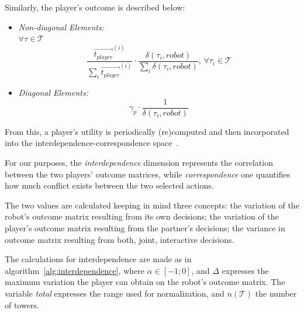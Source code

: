 \begin{itemize}
\end{itemize}

Similarly, the player's outcome is described below:
\begin{itemize}
\item \textit{Non-diagonal Elements:}\\
$\forall\tau \in \mathcal{T}$\\
\begin{equation}
 \frac{\overrightarrow{t_{player}}^{(i)}}{\sum_{i}{\overrightarrow{t_{player}}^{(i)}}} \cdot \frac{\delta(\tau_{i},robot)}{\sum_{i}{\delta(\tau_{i},robot)}}, \, \forall\tau_{i} \in \mathcal{T} 
\end{equation}
\item \textit{Diagonal Elements:}
\begin{equation}
\gamma_p \cdot \frac{1}{\delta(\tau_{i},robot)}
\end{equation}
\end{itemize}

From this, a player's utility is periodically (re)computed and then incorporated into the interdependence-correspondence space~\cite{wagner_acting_2011}.

For our purposes, the \textit{interdependence} dimension represents the correlation between the two players' outcome matrices, while \textit{correspondence} one quantifies how much conflict exists between the two selected actions.

The two values are calculated keeping in mind three concepts: the variation of the robot's outcome matrix resulting from its own decisions; the variation of the player's outcome matrix resulting from the partner's decisions; the variance in outcome matrix resulting from both, joint, interactive decisions.

The calculations for interdependence are made as in algorithm~\ref{alg:interdependence}, where $\alpha \in[-1;0]$, and $\Delta$ expresses the maximum variation the player can obtain on the robot's outcome matrix. The variable \textit{total} expresses the range used for normalization, and $n(\mathcal{T})$ the number of towers.

